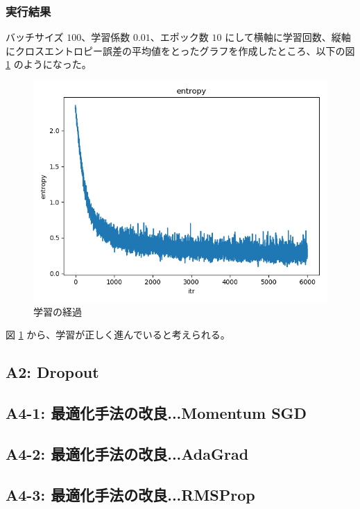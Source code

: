 \documentclass[a4paper,dvipdfmx]{jsarticle}
\begin{document}
\subsubsection*{実行結果}

バッチサイズ $100$、学習係数 $0.01$、エポック数 $10$ にして横軸に学習回数、縦軸にクロスエントロピー誤差の平均値をとったグラフを作成したところ、以下の図 \ref{fig-A-1-1} のようになった。

\begin{figure}[H]
\centering
\includegraphics[width=12cm]{report_ReLU10epoch.png}
\caption{学習の経過}
\label{fig-A-1-1}
\end{figure}

図 \ref{fig-A-1-1} から、学習が正しく進んでいると考えられる。

\subsection*{A2: Dropout}

\subsection*{A4-1: 最適化手法の改良...Momentum SGD}


\subsection*{A4-2: 最適化手法の改良...AdaGrad}

\subsection*{A4-3: 最適化手法の改良...RMSProp}
\end{document}
